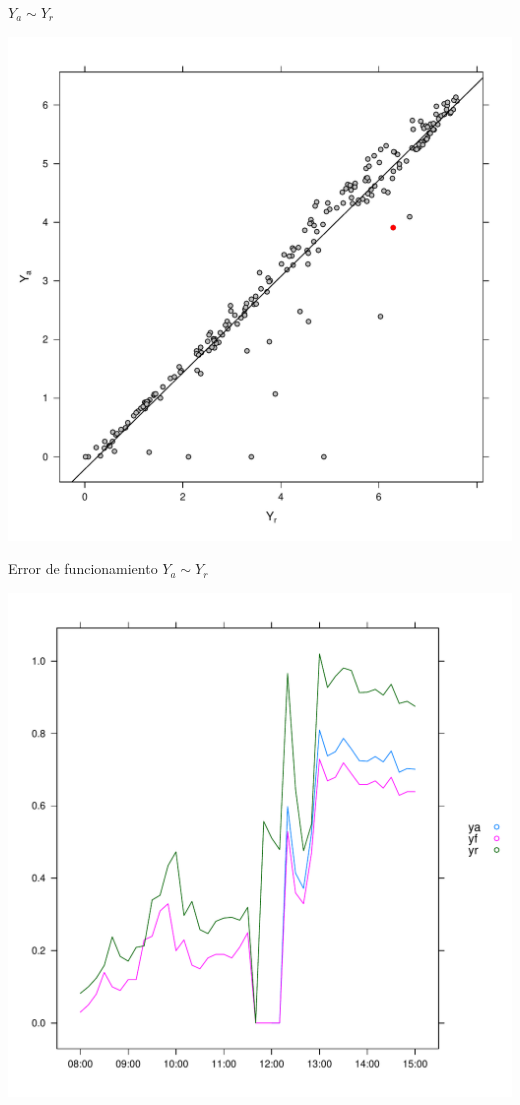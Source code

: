 \documentclass[aspectratio=169, usenames,svgnames,dvipsnames]{beamer}
\begin{document}
\begin{frame}[label={sec:orgf619acb}]{\(Y_a \sim Y_r\)}
\begin{center}
\includegraphics[height=0.95\textheight]{../figs/YaYr.pdf}
\end{center}
\end{frame}

\begin{frame}[label={sec:orga880a44}]{Error de funcionamiento \(Y_a \sim Y_r\)}
\begin{center}
\includegraphics[height=0.95\textheight]{../figs/ErrorMonitorizacion.pdf}
\end{center}
\end{frame}
\end{document}
